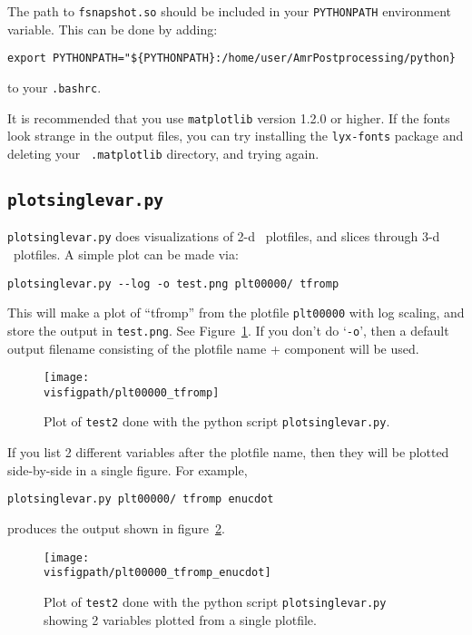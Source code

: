 The path to {\tt fsnapshot.so} should be included in your {\tt PYTHONPATH}
environment variable.  This can be done by adding:
\begin{verbatim}
export PYTHONPATH="${PYTHONPATH}:/home/user/AmrPostprocessing/python}
\end{verbatim}
to your {\tt .bashrc}.

It is recommended that you use {\tt matplotlib} version 1.2.0 or
higher.  If the fonts look strange in the output files, you can try
installing the {\tt lyx-fonts} package and deleting your {\tt
  .matplotlib} directory, and trying again.

\subsection{\tt plotsinglevar.py}

{\tt plotsinglevar.py} does visualizations of 2-d \boxlib\ plotfiles,
and slices through 3-d \boxlib\ plotfiles.  A simple plot can be made
via:
\begin{verbatim}
plotsinglevar.py --log -o test.png plt00000/ tfromp
\end{verbatim}
This will make a plot of ``tfromp'' from the plotfile {\tt plt00000} with log scaling,
and store the output in {\tt test.png}.  See Figure~\ref{fig:python}.
If you don't do `{\tt -o}', then a default output filename consisting of the
plotfile name + component will be used.

\begin{figure}[t]
\centering
\texttt{[image: \\visfigpath/plt00000\_tfromp]}
\caption[Basic plot of {\tt test2} done with {\tt plotsinglevar.py}]
{\label{fig:python} Plot of {\tt test2} done with the python
  script {\tt plotsinglevar.py}.}
\end{figure}

If you list 2 different variables after the plotfile name, then they
will be plotted side-by-side in a single figure.  For example, 
\begin{verbatim}
plotsinglevar.py plt00000/ tfromp enucdot
\end{verbatim}
produces the output shown in figure~\ref{fig:python_two}.

\begin{figure}[t]
\centering
\texttt{[image: \\visfigpath/plt00000\_tfromp\_enucdot]}
\caption[Plot of two variables from {\tt test2} done with {\tt plotsinglevar.py}]
{\label{fig:python_two} Plot of {\tt test2} done with the
  python script {\tt plotsinglevar.py} showing 2 variables plotted
  from a single plotfile.}
\end{figure}


